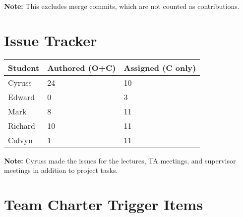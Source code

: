 \documentclass{article}
\begin{document}
\textbf{Note:} This excludes merge commits, which are not counted as contributions.

\section{Issue Tracker}


\begin{table}[H]
\centering
\begin{tabular}{lll}
\toprule
\textbf{Student} & \textbf{Authored (O+C)} & \textbf{Assigned (C only)}\\
\midrule
Cyruss & 24 & 10 \\
Edward & 0 & 3 \\
Mark & 8 & 11 \\
Richard & 10 & 11 \\
Calvyn & 1 & 11 \\
\bottomrule
\end{tabular}
\end{table}


\textbf{Note:} Cyruss made the issues for the lectures, TA meetings, and supervisor meetings in addition to project tasks.

\section{Team Charter Trigger Items}
\end{document}
